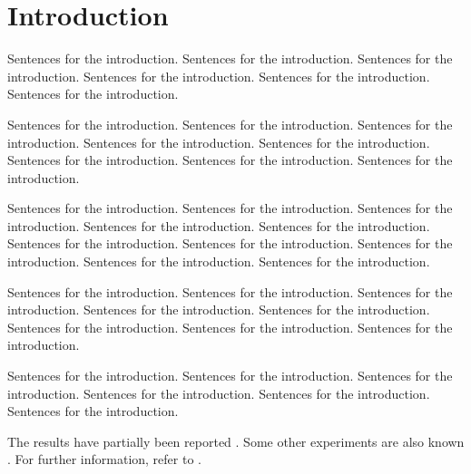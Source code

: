 \chapter{Introduction}

Sentences for the introduction.  Sentences for the introduction.
Sentences for the introduction.  Sentences for the introduction.
Sentences for the introduction.  Sentences for the introduction.

Sentences for the introduction.  Sentences for the introduction.
Sentences for the introduction.  Sentences for the introduction.
Sentences for the introduction.  Sentences for the introduction.
Sentences for the introduction.  Sentences for the introduction.

Sentences for the introduction.  Sentences for the introduction.
Sentences for the introduction.  Sentences for the introduction.
Sentences for the introduction.  Sentences for the introduction.
Sentences for the introduction.  Sentences for the introduction.
Sentences for the introduction.  Sentences for the introduction.

Sentences for the introduction.  Sentences for the introduction.
Sentences for the introduction.  Sentences for the introduction.
Sentences for the introduction.  Sentences for the introduction.
Sentences for the introduction.  Sentences for the introduction.

Sentences for the introduction.  Sentences for the introduction.
Sentences for the introduction.  Sentences for the introduction.
Sentences for the introduction.  Sentences for the introduction.

The results have partially been reported \citep{92795}.
Some other experiments are also known \citep{Knuth86, BollenHHJ07}.
For further information, refer to .
